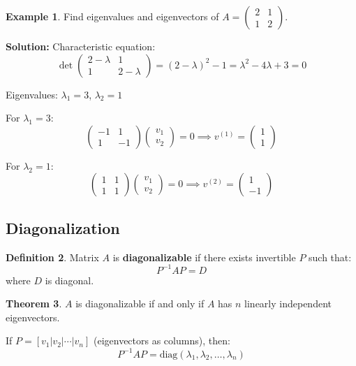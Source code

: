 \documentclass[12pt,a4paper]{article}
\theoremstyle{definition}
\newtheorem{theorem}{Theorem}[section]
\newtheorem{definition}[theorem]{Definition}
\newtheorem{example}[theorem]{Example}
\begin{document}
\begin{example}
Find eigenvalues and eigenvectors of $A = \begin{pmatrix}2 & 1 \\ 1 & 2\end{pmatrix}$.

\textbf{Solution:}
Characteristic equation:
\[
\det\begin{pmatrix}2-\lambda & 1 \\ 1 & 2-\lambda\end{pmatrix} = (2-\lambda)^2 - 1 = \lambda^2 - 4\lambda + 3 = 0
\]

Eigenvalues: $\lambda_1 = 3$, $\lambda_2 = 1$

For $\lambda_1 = 3$:
\[
\begin{pmatrix}-1 & 1 \\ 1 & -1\end{pmatrix}\begin{pmatrix}v_1 \\ v_2\end{pmatrix} = 0 \implies v^{(1)} = \begin{pmatrix}1 \\ 1\end{pmatrix}
\]

For $\lambda_2 = 1$:
\[
\begin{pmatrix}1 & 1 \\ 1 & 1\end{pmatrix}\begin{pmatrix}v_1 \\ v_2\end{pmatrix} = 0 \implies v^{(2)} = \begin{pmatrix}1 \\ -1\end{pmatrix}
\]
\end{example}

\subsection{Diagonalization}

\begin{definition}
Matrix $A$ is \textbf{diagonalizable} if there exists invertible $P$ such that:
\[
P^{-1}AP = D
\]
where $D$ is diagonal.
\end{definition}

\begin{theorem}
$A$ is diagonalizable if and only if $A$ has $n$ linearly independent eigenvectors.

If $P = [v_1 | v_2 | \cdots | v_n]$ (eigenvectors as columns), then:
\[
P^{-1}AP = \text{diag}(\lambda_1, \lambda_2, \ldots, \lambda_n)
\]
\end{theorem}
\end{document}
